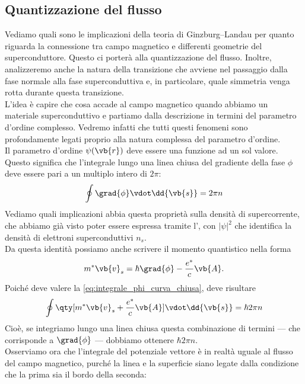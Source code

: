 \subsection{Quantizzazione del flusso}
Vediamo quali sono le implicazioni della teoria di Ginzburg--Landau per quanto riguarda la connessione tra campo magnetico e differenti geometrie del superconduttore. Questo ci porterà alla quantizzazione del flusso. Inoltre, analizzeremo anche la natura della transizione che avviene nel passaggio dalla fase normale alla fase superconduttiva e, in particolare, quale simmetria venga rotta durante questa transizione.\\
L'idea è capire che cosa accade al campo magnetico quando abbiamo un materiale superconduttivo e partiamo dalla descrizione in termini del parametro d'ordine complesso. Vedremo infatti che tutti questi fenomeni sono profondamente legati proprio alla natura complessa del parametro d'ordine.\\
Il parametro d'ordine $\psi(\vb{r})$ deve essere una funzione ad un sol valore. Questo significa che l'integrale lungo una linea chiusa del gradiente della fase $\phi$ deve essere pari a un multiplo intero di $2\pi$:
\begin{equation}
    \oint \grad{\phi} \vdot \dd{\vb{s}}
    =
    2\pi n
    \label{eq:integrale_phi_curva_chiusa}
\end{equation}
Vediamo quali implicazioni abbia questa proprietà sulla densità di supercorrente, che abbiamo già visto poter essere espressa tramite l', con $|\psi|^2$ che identifica la densità di elettroni superconduttivi $n_s$.\\
Da questa identità possiamo anche scrivere il momento quantistico nella forma
\begin{equation*}
    m^*\vb{v}_s
    =
    \hbar \grad{\phi}
    -
    \frac{e^*}{c}\vb{A}.
\end{equation*}
Poiché deve valere la \eqref{eq:integrale_phi_curva_chiusa}, deve risultare
\begin{equation}
   \oint \qty[ m^* \vb{v}_s + \frac{e^*}{c}\vb{A} ] \vdot \dd{\vb{s}}
   =\hbar 2\pi n
   \label{eq:integrale_momento_curva_chiusa}
\end{equation}
Cioè, se integriamo lungo una linea chiusa questa combinazione di termini — che corrisponde a $\grad{\phi}$ — dobbiamo ottenere $\hbar 2\pi n$.\\
Osserviamo ora che l'integrale del potenziale vettore è in realtà uguale al flusso del campo magnetico, purché la linea e la superficie siano legate dalla condizione che la prima sia il bordo della seconda:
